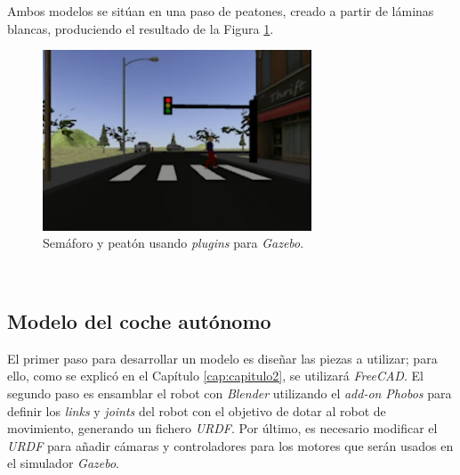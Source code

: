 Ambos modelos se sitúan en una paso de peatones, creado a partir de láminas blancas, produciendo el resultado de la Figura \ref{fig:trafficlightpedestrian}.\\

\begin{figure} [h!]
	\begin{center}
		\includegraphics[width=8cm]{figs/trafficlightpedestrian}
	\end{center}
	\caption{Semáforo y peatón usando \textit{plugins} para \textit{Gazebo}.}
	\label{fig:trafficlightpedestrian}
\end{figure}\

\subsection{Modelo del coche autónomo}
\label{subsection:vehiclemodel}
El primer paso para desarrollar un modelo es diseñar las piezas a utilizar; para ello, como se explicó en el Capítulo \ref{cap:capitulo2}, se utilizará \textit{FreeCAD}. El segundo paso es ensamblar el robot con \textit{Blender} utilizando el \textit{add-on} \textit{Phobos} para definir los \textit{links} y \textit{joints} del robot con el objetivo de dotar al robot de movimiento, generando un fichero \textit{URDF}. Por último, es necesario modificar el \textit{URDF} para añadir cámaras y controladores para los motores que serán usados en el simulador \textit{Gazebo}.\\

